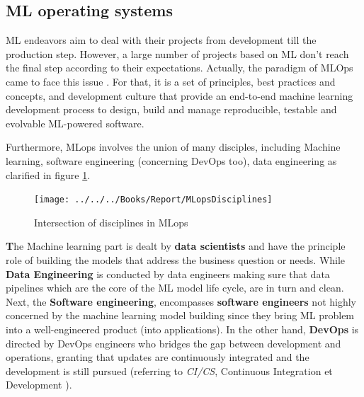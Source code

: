 \documentclass[12pt,a4paper]{report}
\begin{document}
\subsection{\textbf{{\large  ML operating systems}}} 
ML endeavors aim to deal with their projects from development till the production step. However, a large number of projects based on ML don't reach the final step according to their expectations. Actually, the paradigm of MLOps came to face this issue \cite{kreuzberger2023machine}. For that, it is a set of principles, best practices and concepts, and development culture that provide an end-to-end machine learning development process to design, build and manage reproducible, testable and evolvable ML-powered software. 

Furthermore, MLops involves the union of many disciples, including Machine learning, software engineering (concerning DevOps too), data engineering as clarified in figure \ref{fig:mlopsdisciplines}.
\begin{figure}[h!]
	\centering
	\texttt{[image: ../../../Books/Report/MLopsDisciplines]}
	\caption{Intersection of disciplines in MLops}
	\label{fig:mlopsdisciplines}
\end{figure} 

\textbf The {Machine learning part} is dealt by \textbf{data scientists} and have the principle role of building the models that address the business question or needs. While \textbf{Data Engineering} is conducted by data engineers making sure that data pipelines which are the core of the ML model life cycle, are in turn and clean. Next, the \textbf{Software engineering}, encompasses \textbf{software engineers} not highly concerned by the machine learning model building since they bring ML problem into a well-engineered product (into applications). 
In the other hand, \textbf{DevOps} is directed by DevOps engineers who bridges the gap between development and operations, granting that updates are continuously integrated and the development is still pursued (referring to \textit{CI/CS}, Continuous Integration et Development ). \\
\end{document}
